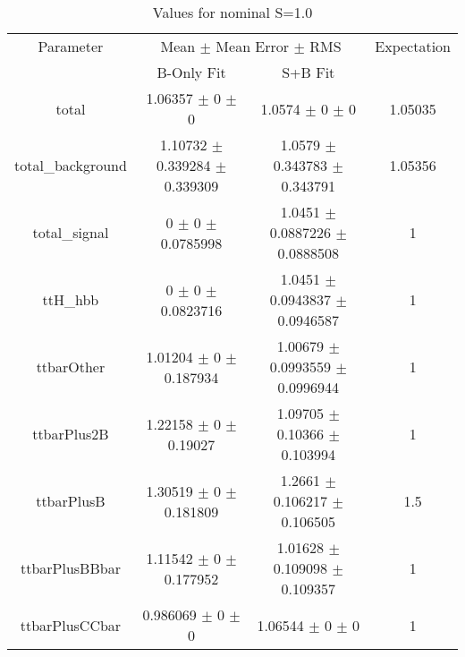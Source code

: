 \begin{table}
\centering
\caption{Values for nominal S=1.0}
\begin{tabular}{cccc}
\toprule
Parameter & \multicolumn{2}{c}{Mean $\pm$ Mean Error $\pm$ RMS} & Expectation\\
 & B-Only Fit & S+B Fit & \\
\midrule
total & \num{1.06357} $\pm$ \num{0} $\pm$ \num{0} & \num{1.0574} $\pm$ \num{0} $\pm$ \num{0} & \num{1.05035}\\
total\_background & \num{1.10732} $\pm$ \num{0.339284} $\pm$ \num{0.339309} & \num{1.0579} $\pm$ \num{0.343783} $\pm$ \num{0.343791} & \num{1.05356}\\
total\_signal & \num{0} $\pm$ \num{0} $\pm$ \num{0.0785998} & \num{1.0451} $\pm$ \num{0.0887226} $\pm$ \num{0.0888508} & \num{1}\\
ttH\_hbb & \num{0} $\pm$ \num{0} $\pm$ \num{0.0823716} & \num{1.0451} $\pm$ \num{0.0943837} $\pm$ \num{0.0946587} & \num{1}\\
ttbarOther & \num{1.01204} $\pm$ \num{0} $\pm$ \num{0.187934} & \num{1.00679} $\pm$ \num{0.0993559} $\pm$ \num{0.0996944} & \num{1}\\
ttbarPlus2B & \num{1.22158} $\pm$ \num{0} $\pm$ \num{0.19027} & \num{1.09705} $\pm$ \num{0.10366} $\pm$ \num{0.103994} & \num{1}\\
ttbarPlusB & \num{1.30519} $\pm$ \num{0} $\pm$ \num{0.181809} & \num{1.2661} $\pm$ \num{0.106217} $\pm$ \num{0.106505} & \num{1.5}\\
ttbarPlusBBbar & \num{1.11542} $\pm$ \num{0} $\pm$ \num{0.177952} & \num{1.01628} $\pm$ \num{0.109098} $\pm$ \num{0.109357} & \num{1}\\
ttbarPlusCCbar & \num{0.986069} $\pm$ \num{0} $\pm$ \num{0} & \num{1.06544} $\pm$ \num{0} $\pm$ \num{0} & \num{1}\\
\bottomrule
\end{tabular}
\end{table}